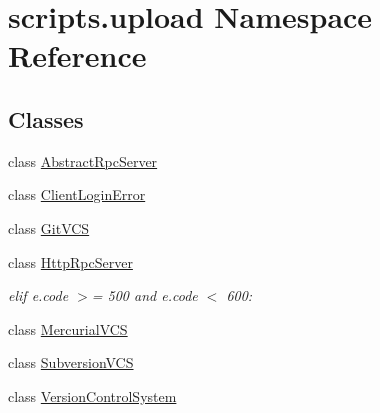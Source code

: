 \hypertarget{namespacescripts_1_1upload}{}\section{scripts.\+upload Namespace Reference}
\label{namespacescripts_1_1upload}
\subsection*{Classes}
\begin{DoxyCompactItemize}
\item 
class \mbox{\hyperlink{classscripts_1_1upload_1_1_abstract_rpc_server}{Abstract\+Rpc\+Server}}
\item 
class \mbox{\hyperlink{classscripts_1_1upload_1_1_client_login_error}{Client\+Login\+Error}}
\item 
class \mbox{\hyperlink{classscripts_1_1upload_1_1_git_v_c_s}{Git\+V\+CS}}
\item 
class \mbox{\hyperlink{classscripts_1_1upload_1_1_http_rpc_server}{Http\+Rpc\+Server}}
\begin{DoxyCompactList}\small\item\em elif e.\+code $>$= 500 and e.\+code $<$ 600\+: \end{DoxyCompactList}\item 
class \mbox{\hyperlink{classscripts_1_1upload_1_1_mercurial_v_c_s}{Mercurial\+V\+CS}}
\item 
class \mbox{\hyperlink{classscripts_1_1upload_1_1_subversion_v_c_s}{Subversion\+V\+CS}}
\item 
class \mbox{\hyperlink{classscripts_1_1upload_1_1_version_control_system}{Version\+Control\+System}}
\end{DoxyCompactItemize}
